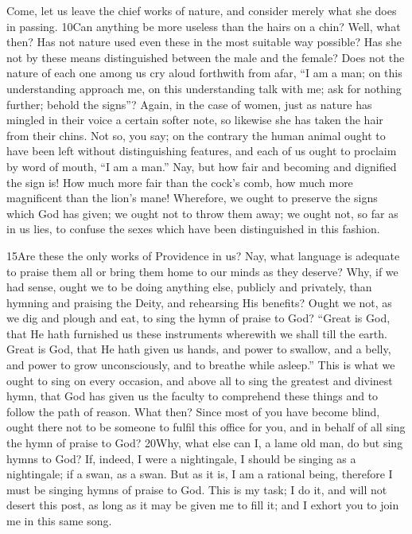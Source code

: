 Come, let us leave the chief works of nature, and consider merely what she does in passing. 10Can anything be more useless than the hairs on a chin? Well, what then? Has not nature used even these in the most suitable way possible? Has she not by these means distinguished between the male and the female? Does not the nature of each one among us cry aloud forthwith from afar, ``I am a man; on this understanding approach me, on this understanding talk with me; ask for nothing further; behold the signs''? Again, in the case of women, just as nature has mingled in their voice a certain softer note, so likewise she has taken the hair from their chins. Not so, you say; on the contrary the human animal ought to have been left without distinguishing features, and each of us ought to proclaim by word of mouth, ``I am a man.'' Nay, but how fair and becoming and dignified the sign is! How much more fair than the cock's comb, how much more magnificent than the lion's mane! Wherefore, we ought to preserve the signs which God has given; we ought not to throw them away; we ought not, so far as in us lies, to confuse the sexes which have been distinguished in this fashion.

15Are these the only works of Providence in us? Nay, what language is adequate to praise them all or bring them home to our minds as they deserve? Why, if we had sense, ought we to be doing anything else, publicly and privately, than hymning and praising the Deity, and rehearsing His benefits? Ought we not, as we dig and plough and eat, to sing the hymn of praise to God? ``Great is God, that He hath furnished us these instruments wherewith we shall till the earth. Great is God, that He hath given us hands, and power to swallow, and a belly, and power to grow unconsciously, and to breathe while asleep.'' This is what we ought to sing on every occasion, and above all to sing the greatest and divinest hymn, that God has given us the faculty to comprehend these things and to follow the path of reason. What then? Since most of you have become blind, ought there not to be someone to fulfil this office for you, and in behalf of all sing the hymn of praise to God? 20Why, what else can I, a lame old man, do but sing hymns to God? If, indeed, I were a nightingale, I should be singing as a nightingale; if a swan, as a swan. But as it is, I am a rational being, therefore I must be singing hymns of praise to God. This is my task; I do it, and will not desert this post, as long as it may be given me to fill it; and I exhort you to join me in this same song.

